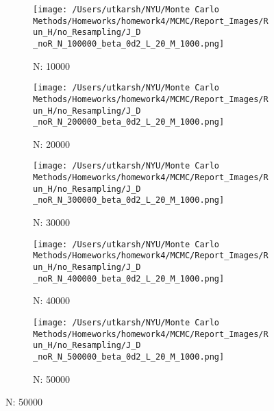 \documentclass[11pt]{article}
\begin{document}
\begin{figure}[H]
	\centering
	\begin{subfigure}{.18\textwidth}
		\texttt{[image: /Users/utkarsh/NYU/Monte Carlo Methods/Homeworks/homework4/MCMC/Report\_Images/Run\_H/no\_Resampling/J\_D \_noR\_N\_100000\_beta\_0d2\_L\_20\_M\_1000.png]}
		\caption{N: 10000}
	\end{subfigure}
	\begin{subfigure}{.18\textwidth}
		\texttt{[image: /Users/utkarsh/NYU/Monte Carlo Methods/Homeworks/homework4/MCMC/Report\_Images/Run\_H/no\_Resampling/J\_D \_noR\_N\_200000\_beta\_0d2\_L\_20\_M\_1000.png]}
		\caption{N: 20000}
	\end{subfigure}
	\begin{subfigure}{.18\textwidth}
		\texttt{[image: /Users/utkarsh/NYU/Monte Carlo Methods/Homeworks/homework4/MCMC/Report\_Images/Run\_H/no\_Resampling/J\_D \_noR\_N\_300000\_beta\_0d2\_L\_20\_M\_1000.png]}
		\caption{N: 30000}
	\end{subfigure}	
	\begin{subfigure}{.18\textwidth}
		\texttt{[image: /Users/utkarsh/NYU/Monte Carlo Methods/Homeworks/homework4/MCMC/Report\_Images/Run\_H/no\_Resampling/J\_D \_noR\_N\_400000\_beta\_0d2\_L\_20\_M\_1000.png]}
		\caption{N: 40000}
	\end{subfigure}	
	\begin{subfigure}{.18\textwidth}
		\texttt{[image: /Users/utkarsh/NYU/Monte Carlo Methods/Homeworks/homework4/MCMC/Report\_Images/Run\_H/no\_Resampling/J\_D \_noR\_N\_500000\_beta\_0d2\_L\_20\_M\_1000.png]}
		\caption{N: 50000}
	\end{subfigure}	


\end{figure}
\end{document}
